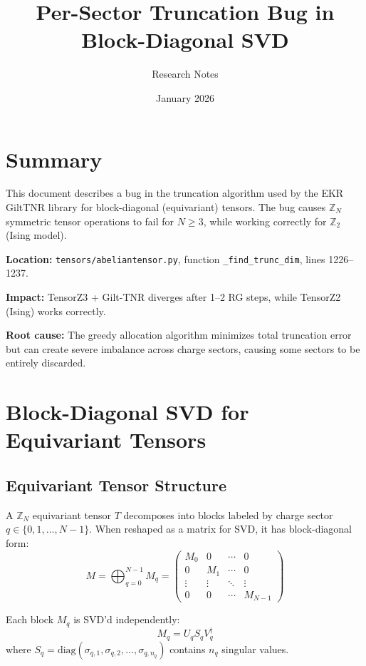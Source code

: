 \documentclass{article}
\title{Per-Sector Truncation Bug in Block-Diagonal SVD}
\author{Research Notes}
\date{January 2026}
\begin{document}
\maketitle

\section{Summary}

This document describes a bug in the truncation algorithm used by the EKR GiltTNR library for block-diagonal (equivariant) tensors. The bug causes $\mathbb{Z}_N$ symmetric tensor operations to fail for $N \geq 3$, while working correctly for $\mathbb{Z}_2$ (Ising model).

\textbf{Location:} \texttt{tensors/abeliantensor.py}, function \texttt{\_find\_trunc\_dim}, lines 1226--1237.

\textbf{Impact:} TensorZ3 + Gilt-TNR diverges after 1--2 RG steps, while TensorZ2 (Ising) works correctly.

\textbf{Root cause:} The greedy allocation algorithm minimizes total truncation error but can create severe imbalance across charge sectors, causing some sectors to be entirely discarded.

\section{Block-Diagonal SVD for Equivariant Tensors}

\subsection{Equivariant Tensor Structure}

A $\mathbb{Z}_N$ equivariant tensor $T$ decomposes into blocks labeled by charge sector $q \in \{0, 1, \ldots, N-1\}$. When reshaped as a matrix for SVD, it has block-diagonal form:
\begin{equation}
    M = \bigoplus_{q=0}^{N-1} M_q = \begin{pmatrix} M_0 & 0 & \cdots & 0 \\ 0 & M_1 & \cdots & 0 \\ \vdots & \vdots & \ddots & \vdots \\ 0 & 0 & \cdots & M_{N-1} \end{pmatrix}
\end{equation}

Each block $M_q$ is SVD'd independently:
\begin{equation}
    M_q = U_q S_q V_q^\dagger
\end{equation}
where $S_q = \text{diag}(\sigma_{q,1}, \sigma_{q,2}, \ldots, \sigma_{q,n_q})$ contains $n_q$ singular values.
\end{document}
